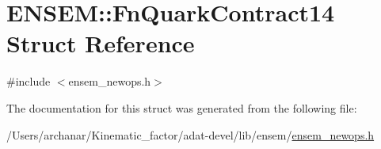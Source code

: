\hypertarget{structENSEM_1_1FnQuarkContract14}{}\section{E\+N\+S\+EM\+:\+:Fn\+Quark\+Contract14 Struct Reference}
\label{structENSEM_1_1FnQuarkContract14}


{\ttfamily \#include $<$ensem\+\_\+newops.\+h$>$}



The documentation for this struct was generated from the following file\+:\begin{DoxyCompactItemize}
\item 
/\+Users/archanar/\+Kinematic\+\_\+factor/adat-\/devel/lib/ensem/\mbox{\hyperlink{adat-devel_2lib_2ensem_2ensem__newops_8h}{ensem\+\_\+newops.\+h}}\end{DoxyCompactItemize}
